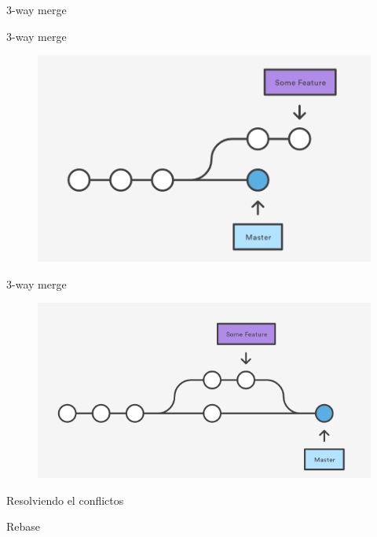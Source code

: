 \documentclass{beamer}
\begin{document}
\begin{frame}{}
	\center\Huge{3-way merge}
\end{frame}


\begin{frame}{3-way merge}
\begin{figure}
	\centering
	\includegraphics[width=1\linewidth]{3}
	\label{fig:3}
\end{figure}
\end{frame}

\begin{frame}{3-way merge}
\begin{figure}
	\centering
	\includegraphics[width=1\linewidth]{4}
	\label{fig:4}
\end{figure}
\end{frame}

\begin{frame}{}
	\center\Huge{Resolviendo el conflictos}
\end{frame}

\begin{frame}{}
	\center\Huge{Rebase}
\end{frame}
\end{document}
